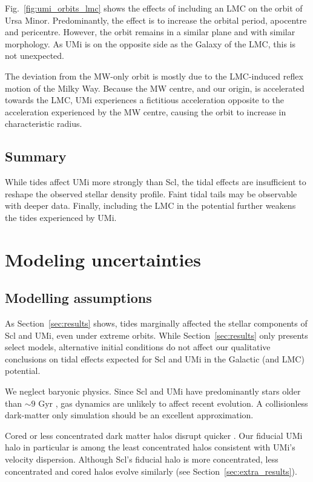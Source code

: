 Fig.~\ref{fig:umi_orbits_lmc} shows the effects of including an LMC on
the orbit of Ursa Minor. Predominantly, the effect is to increase the
orbital period, apocentre and pericentre. However, the orbit remains in
a similar plane and with similar morphology. As UMi is on the opposite
side as the Galaxy of the LMC, this is not unexpected.

The deviation from the MW-only orbit is mostly due to the LMC-induced
reflex motion of the Milky Way. Because the MW centre, and our origin,
is accelerated towards the LMC, UMi experiences a fictitious
acceleration opposite to the acceleration experienced by the MW centre,
causing the orbit to increase in characteristic radius.

\subsection{Summary}\label{summary-1}

While tides affect UMi more strongly than Scl, the tidal effects are
insufficient to reshape the observed stellar density profile. Faint
tidal tails may be observable with deeper data. Finally, including the
LMC in the potential further weakens the tides experienced by UMi.

\section{Modeling uncertainties}\label{modeling-uncertainties}

\subsection{Modelling assumptions}\label{modelling-assumptions}

As Section~\ref{sec:results} shows, tides marginally affected the
stellar components of Scl and UMi, even under extreme orbits. While
Section~\ref{sec:results} only presents select models, alternative
initial conditions do not affect our qualitative conclusions on tidal
effects expected for Scl and UMi in the Galactic (and LMC) potential.

We neglect baryonic physics. Since Scl and UMi have predominantly stars
older than \(\sim 9\) Gyr
\citep{carrera+2002, deboer+2011, weisz+2014, delosreyes+2022, sato+2025},
gas dynamics are unlikely to affect recent evolution. A collisionless
dark-matter only simulation should be an excellent approximation.

Cored or less concentrated dark matter halos disrupt quicker
\citep[e.g.,][]{stucker+2023}. Our fiducial UMi halo in particular is
among the least concentrated halos consistent with UMi's velocity
dispersion. Although Scl's fiducial halo is more concentrated, less
concentrated and cored halos evolve similarly (see
Section~\ref{sec:extra_results}).

